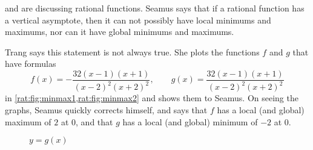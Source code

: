 \begin{pccexample}
  and  are discussing rational functions. Seamus says that 
if a rational function has a vertical asymptote, then it can 
not possibly have local minimums and maximums, nor can it have 
global minimums and maximums.

Trang says this statement is not always true. She plots the functions 
$f$ and $g$ that have formulas
\[
f(x)=-\frac{32(x-1)(x+1)}{(x-2)^2(x+2)^2}, \qquad g(x)=\frac{32(x-1)(x+1)}{(x-2)^2(x+2)^2}
\]
in \cref{rat:fig:minmax1,rat:fig:minmax2} and shows them to Seamus. On seeing the graphs, 
Seamus quickly corrects himself, and says  that $f$ has a local (and global) 
maximum of $2$ at $0$, and that $g$ has a local (and global) minimum of $-2$ at $0$.

\begin{figure}[!htb]
    \begin{minipage}{.45\textwidth}
            \caption{$y=f(x)$}
            \label{rat:fig:minmax1}
    \end{minipage}%
    \hfill
    \begin{minipage}{.45\textwidth}
            \caption{$y=g(x)$}
            \label{rat:fig:minmax2}
    \end{minipage}%
\end{figure}


\end{pccexample}
